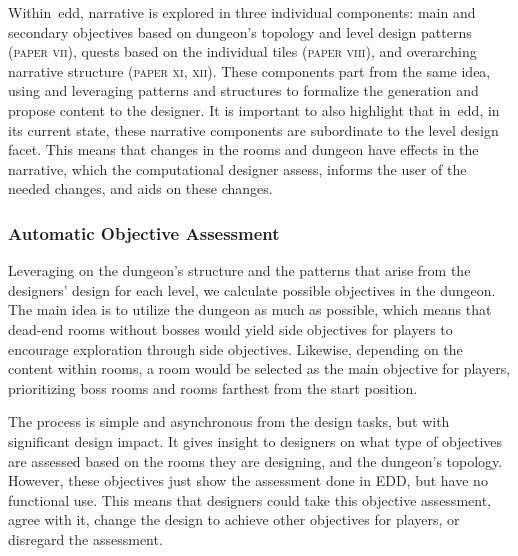 Within~\acrshort{edd}, narrative is explored in three individual components: main and secondary objectives based on dungeon's topology and level design patterns (\textsc{paper vii}), quests based on the individual tiles (\textsc{paper viii}), and overarching narrative structure (\textsc{paper xi, xii}). These components part from the same idea, using and leveraging patterns and structures to formalize the generation and propose content to the designer. It is important to also highlight that in~\acrshort{edd}, in its current state, these narrative components are subordinate to the level design facet. This means that changes in the rooms and dungeon have effects in the narrative, which the computational designer assess, informs the user of the needed changes, and aids on these changes.



\subsubsection{Automatic Objective Assessment}

Leveraging on the dungeon's structure and the patterns that arise from the designers' design for each level, we calculate possible objectives in the dungeon. The main idea is to utilize the dungeon as much as possible, which means that dead-end rooms without bosses would yield side objectives for players to encourage exploration through side objectives. Likewise, depending on the content within rooms, a room would be selected as the main objective for players, prioritizing boss rooms and rooms farthest from the start position. 

The process is simple and asynchronous from the design tasks, but with significant design impact. It gives insight to designers on what type of objectives are assessed based on the rooms they are designing, and the dungeon's topology. However, these objectives just show the assessment done in EDD, but have no functional use. This means that designers could take this objective assessment, agree with it, change the design to achieve other objectives for players, or disregard the assessment. 

